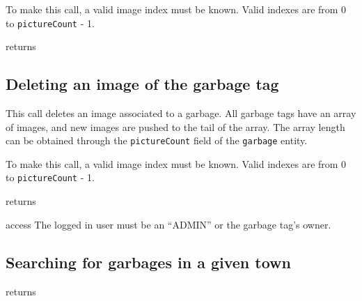 To make this call, a valid image index must be known. Valid indexes are from 0
to \texttt{pictureCount} - 1.

\begin{apidata}{returns}
  \begin{datalist}
  \end{datalist}
\end{apidata}


\subsection{Deleting an image of the garbage tag}

This call deletes an image associated to a garbage. All garbage tags have an
array of images, and new images are pushed to the tail of the array. The array
length can be obtained through the \texttt{pictureCount} field of the
\texttt{garbage} entity. 

To make this call, a valid image index must be known. Valid indexes are from 0
to \texttt{pictureCount} - 1.

\begin{apidata}{returns}
  \begin{datalist}
  \end{datalist}
\end{apidata}
\begin{apidata}{access}
The logged in user must be an ``ADMIN'' or the garbage tag's owner.
\end{apidata}


\subsection{Searching for garbages in a given town}

\begin{apidata}{returns}
  \begin{datalist}
  \end{datalist}
\end{apidata}


